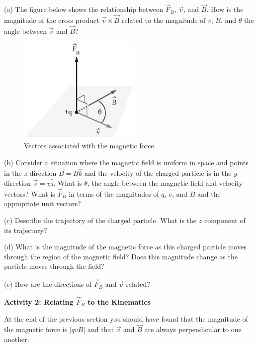 (a) The figure below shows the relationship between $\vec F_B$, $\vec v$,
and $\vec B$.
How is the magnitude of the cross product $\vec v \times \vec B$ related to
the magnitude of $v$, $B$, and $\theta$ the angle between $\vec v$ 
and $\vec B$?
\vspace{5mm}

\begin{figure}[h!]
\begin{center}
\includegraphics[height=2.0in]{eoverm/vCrossB_bw.eps}
\caption{Vectors associated with the magnetic force. \hfill}
\end{center}
\end{figure}

(b) Consider a situation where the magnetic field is uniform in space
and points in the $z$ direction $\vec B = B \hat k$ and the velocity of
the charged particle is in the $y$ direction $\vec v = v \hat j$. 
What is $\theta$, the angle between the magnetic field and velocity vectors?
What is 
$\vec F_B$ in terms of the magnitudes of $q$, $v$, and $B$ and the appropriate unit
vectors?
\vspace{25mm}


(c) Describe the trajectory of the charged particle.
What is the $z$ component of its trajectory?
\vspace{30mm}

(d) What is the magnitude of the magnetic force as this charged particle
moves through the region of the magnetic field?
Does this magnitude change as the particle moves through the field?
\vspace{15mm}

(e) How are the directions of $\vec F_B$ and $\vec v$ related?
\vspace{15mm}


\textbf{Activity 2: Relating $\vec F_B$ to the Kinematics}

At the end of the previous section you should have found that the magnitude 
of the magnetic force is $|qvB|$ and that $\vec v$ and $\vec B$ are
always perpendicular to one another.

